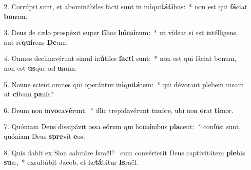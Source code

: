 2. Corrúpti sunt, et abominábiles facti sunt in in\textbf{i}qui\textbf{tá}\textbf{ti}bus:~*  non est qui \textbf{fá}ciat \textbf{bo}num.\

3. Deus de cælo prospéxit super \textbf{fí}lios \textbf{hó}\textbf{mi}num:~*  ut vídeat si est intélligens, aut re\textbf{quí}rens \textbf{De}um.\

4. Omnes declinavérunt simul in\textbf{ú}tiles \textbf{fac}\textbf{ti} sunt:~*  non est qui fáciat bonum, non est \textbf{us}que ad \textbf{u}num.\

5. Nonne scient omnes qui operántur in\textbf{i}qui\textbf{tá}tem:~*  qui dévorant plebem meam ut \textbf{ci}bum \textbf{pa}nis?\

6. Deum non in\textbf{vo}ca\textbf{vé}runt,~*  illic trepidavérunt timóre, ubi non \textbf{e}rat \textbf{ti}mor.\

7. Quóniam Deus dissipávit ossa eórum qui ho\textbf{mí}nibus \textbf{pla}cent:~*  confúsi sunt, quóniam Deus \textbf{spre}vit \textbf{e}os.\

8. Quis dabit ex Sion salutáre Israël? \dag\  cum convérterit Deus captivitátem \textbf{ple}bis \textbf{su}æ,~*  exsultábit Jacob, et læ\textbf{tá}bitur \textbf{Is}raël.\

